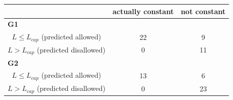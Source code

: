 \begin{tabular}{c|cc}
\hline
 & actually constant & not constant \\
\hline
\multicolumn{3}{l}{\textbf{G1}} \\
$L \le L_{cap}$ (predicted allowed) & 22 & 9 \\
$L > L_{cap}$ (predicted disallowed) & 0 & 11 \\
\multicolumn{3}{l}{\textbf{G2}} \\
$L \le L_{cap}$ (predicted allowed) & 13 & 6 \\
$L > L_{cap}$ (predicted disallowed) & 0 & 23 \\
\hline
\end{tabular}